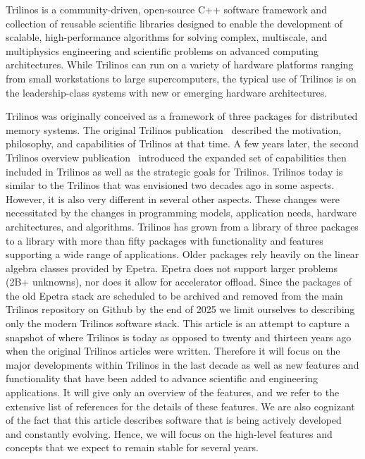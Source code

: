 
Trilinos is a community-driven, open-source C++ software framework and collection of reusable scientific libraries designed to enable the development of scalable, high-performance algorithms for solving complex, multiscale, and multiphysics engineering and scientific problems on advanced computing architectures.
While Trilinos can run on a variety of hardware platforms ranging from small workstations to large supercomputers, the typical use of Trilinos is on the leadership-class systems with new or emerging hardware architectures.

Trilinos was originally conceived as a framework of three packages for distributed memory systems. The original Trilinos publication~\cite{Heroux2005a} described the motivation, philosophy, and capabilities of Trilinos at that time. A few years later, the second Trilinos overview publication~\cite{Heroux2012} introduced the expanded set of capabilities then included in Trilinos as well as the strategic goals for Trilinos. Trilinos today is similar to the Trilinos that was envisioned two decades ago in some aspects. However, it is also very different in several other aspects. These changes were necessitated by the changes in programming models, application needs, hardware architectures, and algorithms. Trilinos has grown from a library of three packages to a library with more than fifty packages with functionality and features supporting a wide range of applications.
Older packages rely heavily on the linear algebra classes provided by Epetra.
Epetra does not support larger problems (2B+ unknowns), nor does it allow for accelerator offload.
Since the packages of the old Epetra stack are scheduled to be archived and removed from the main Trilinos repository on Github by the end of 2025 we limit ourselves to describing only the modern Trilinos software stack.
This article is an attempt to capture a snapshot of where Trilinos is today as opposed to twenty and thirteen years ago when the original Trilinos articles were written.
Therefore it will focus on the major developments within Trilinos in the last decade as well as new features and functionality that have been added to advance scientific and engineering applications.
It will give only an overview of the features, and we refer to the extensive list of references for the details of these features.
We are also cognizant of the fact that this article describes software that is being actively developed and constantly evolving.
Hence, we will focus on the high-level features and concepts that we expect to remain stable for several years.



